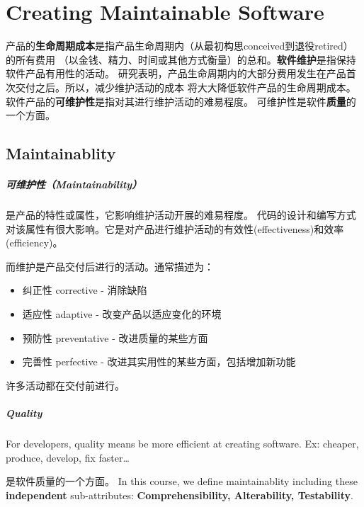 \chapter{Creating Maintainable Software}

产品的\textbf{生命周期成本}是指产品生命周期内（从最初构思conceived到退役retired）的所有费用
（以金钱、精力、时间或其他方式衡量）的总和。\textbf{软件维护}是指保持软件产品有用性的活动。
研究表明，产品生命周期内的大部分费用发生在产品首次交付之后。所以，减少维护活动的成本
将大大降低软件产品的生命周期成本。软件产品的\textbf{可维护性}是指对其进行维护活动的难易程度。
可维护性是软件\textbf{质量}的一个方面。

\section{Maintainablity}
\paragraph{可维护性（Maintainability）}是产品的特性或属性，它影响维护活动开展的难易程度。
代码的设计和编写方式对该属性有很大影响。它是对产品进行维护活动的有效性(effectiveness)和效率(efficiency)。

而维护是产品交付后进行的活动。通常描述为：
\begin{itemize}
    \item 纠正性 corrective - 消除缺陷
    \item 适应性 adaptive - 改变产品以适应变化的环境
    \item 预防性 preventative - 改进质量的某些方面
    \item 完善性 perfective - 改进其实用性的某些方面，包括增加新功能
\end{itemize}

许多活动都在交付前进行。

\paragraph{Quality} For developers, quality means be more efficient at creating software. Ex: cheaper, produce, develop, fix faster\dots


是软件质量的一个方面。 In this course, we define maintainablity including these \textbf{independent} sub-attributes: \textbf{Comprehensibility, Alterability, Testability}.

